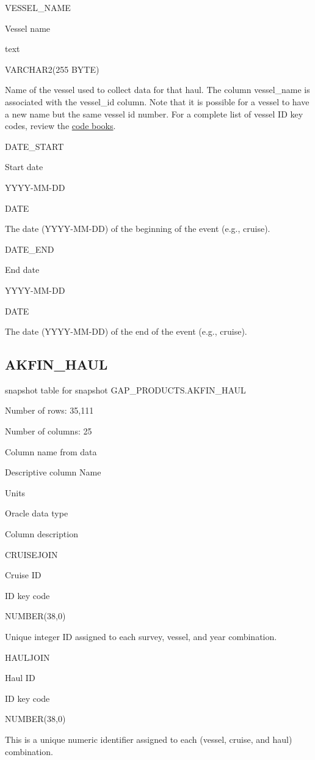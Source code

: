 \documentclass[
  letterpaper,
  oneside,
  open=any]{scrbook}
\begin{document}
VESSEL\_NAME

Vessel name

text

VARCHAR2(255 BYTE)

Name of the vessel used to collect data for that haul. The column
vessel\_name is associated with the vessel\_id column. Note that it is
possible for a vessel to have a new name but the same vessel id number.
For a complete list of vessel ID key codes, review the
\href{https://www.fisheries.noaa.gov/resource/document/groundfish-survey-species-code-manual-and-data-codes-manual}{code
books}.

DATE\_START

Start date

YYYY-MM-DD

DATE

The date (YYYY-MM-DD) of the beginning of the event (e.g., cruise).

DATE\_END

End date

YYYY-MM-DD

DATE

The date (YYYY-MM-DD) of the end of the event (e.g., cruise).

\subsection{AKFIN\_HAUL}\label{akfin_haul}

snapshot table for snapshot GAP\_PRODUCTS.AKFIN\_HAUL

Number of rows: 35,111

Number of columns: 25

Column name from data

Descriptive column Name

Units

Oracle data type

Column description

CRUISEJOIN

Cruise ID

ID key code

NUMBER(38,0)

Unique integer ID assigned to each survey, vessel, and year combination.

HAULJOIN

Haul ID

ID key code

NUMBER(38,0)

This is a unique numeric identifier assigned to each (vessel, cruise,
and haul) combination.
\end{document}
